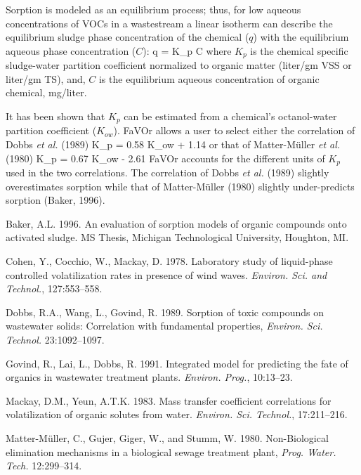 Sorption is modeled as an equilibrium process; thus, for low aqueous
concentrations of VOCs in a wastestream a linear isotherm can describe
the equilibrium sludge phase concentration of the chemical ($q$) with
the equilibrium aqueous phase concentration ($C$):
\mb
q = K_p C
\mef
where $K_p$ is the chemical specific sludge-water partition
coefficient normalized to organic matter (liter/gm VSS or liter/gm
TS), and, $C$ is the equilibrium aqueous concentration of organic
chemical, mg/liter.

It has been shown that $K_p$ can be estimated from a chemical's
octanol-water partition coefficient ($K_{ow}$).  FaVOr allows a user
to select either the correlation of Dobbs  {\it et al.} (1989)
\mb
\log K_p \;  = 0.58 \log K_{ow} + 1.14
\mef
or that of Matter-M\"uller {\it et al.} (1980)
\mb
\log K_p \;  = 0.67 \log K_{ow} - 2.61
\mef
FaVOr accounts for the different units of $K_p$ used in the two
correlations.  The correlation of Dobbs {\it et al.} (1989) slightly
overestimates sorption while that of Matter-M\"uller (1980) slightly
under-predicts sorption (Baker, 1996).


Baker, A.L. 1996. An evaluation of sorption models of organic compounds onto
activated sludge.  MS Thesis, Michigan Technological University, Houghton, MI.

Cohen, Y., Cocchio, W., Mackay, D. 1978. Laboratory study of
liquid-phase controlled volatilization rates in presence of wind
waves. {\it Environ. Sci. and Technol.}, 127:553--558.

Dobbs, R.A., Wang, L., Govind, R. 1989. Sorption of toxic compounds on
wastewater solids: Correlation with fundamental properties, {\it Environ. Sci.
Technol.} 23:1092--1097.

Govind, R., Lai, L., Dobbs, R. 1991. Integrated model for predicting
the fate of organics in wastewater treatment plants. {\it Environ.
Prog.}, 10:13--23.

Mackay, D.M., Yeun, A.T.K. 1983. Mass transfer coefficient correlations for
volatilization of organic solutes from water. {\it Environ. Sci. Technol.},
17:211--216. 

Matter-M\"uller, C., Gujer, Giger, W., and Stumm, W. 1980. Non-Biological
elimination mechanisms in a biological sewage treatment plant, {\it Prog.
Water. Tech.} 12:299--314.




\newpage

